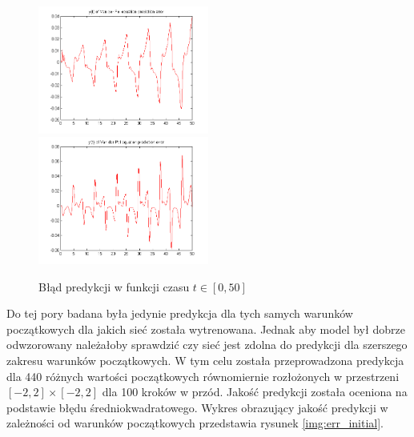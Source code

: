 \begin{figure}[ht!]
	\centering

	\subfloat
	{\includegraphics[width=0.5\textwidth]
	{images/err1000_x1.png}}
	\subfloat
	{\includegraphics[width=0.5\textwidth]
	{images/err1000_x2.png}}	
	

	\caption{Błąd predykcji w funkcji czasu $t \in [0,50]$}
	\label{img:err}
\end{figure}

Do tej pory badana była jedynie predykcja dla tych samych warunków początkowych dla jakich sieć została wytrenowana. Jednak aby model był dobrze odwzorowany należałoby sprawdzić czy sieć jest zdolna do predykcji dla szerszego zakresu warunków początkowych. W tym celu została przeprowadzona predykcja dla 440 różnych wartości początkowych równomiernie rozłożonych w przestrzeni $[-2,2] \times [-2,2]$ dla 100 kroków w przód. Jakość predykcji została oceniona na podstawie błędu średniokwadratowego. Wykres obrazujący jakość predykcji w zależności od warunków początkowych przedstawia rysunek \ref{img:err_initial}.

